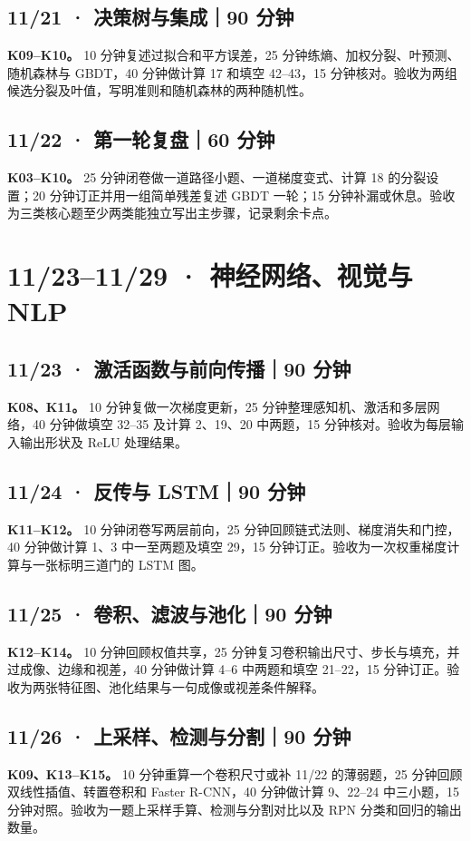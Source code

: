 \documentclass[UTF8,a4paper,11pt]{ctexart}
\begin{document}
\subsection{11/21 · 决策树与集成｜90 分钟}
\textbf{K09–K10。} 10 分钟复述过拟合和平方误差，25 分钟练熵、加权分裂、叶预测、随机森林与 GBDT，40 分钟做计算 17 和填空 42–43，15 分钟核对。验收为两组候选分裂及叶值，写明准则和随机森林的两种随机性。

\subsection{11/22 · 第一轮复盘｜60 分钟}
\textbf{K03–K10。} 25 分钟闭卷做一道路径小题、一道梯度变式、计算 18 的分裂设置；20 分钟订正并用一组简单残差复述 GBDT 一轮；15 分钟补漏或休息。验收为三类核心题至少两类能独立写出主步骤，记录剩余卡点。

\section{11/23–11/29 · 神经网络、视觉与 NLP}
\subsection{11/23 · 激活函数与前向传播｜90 分钟}
\textbf{K08、K11。} 10 分钟复做一次梯度更新，25 分钟整理感知机、激活和多层网络，40 分钟做填空 32–35 及计算 2、19、20 中两题，15 分钟核对。验收为每层输入输出形状及 ReLU 处理结果。

\subsection{11/24 · 反传与 LSTM｜90 分钟}
\textbf{K11–K12。} 10 分钟闭卷写两层前向，25 分钟回顾链式法则、梯度消失和门控，40 分钟做计算 1、3 中一至两题及填空 29，15 分钟订正。验收为一次权重梯度计算与一张标明三道门的 LSTM 图。

\subsection{11/25 · 卷积、滤波与池化｜90 分钟}
\textbf{K12–K14。} 10 分钟回顾权值共享，25 分钟复习卷积输出尺寸、步长与填充，并过成像、边缘和视差，40 分钟做计算 4–6 中两题和填空 21–22，15 分钟订正。验收为两张特征图、池化结果与一句成像或视差条件解释。

\subsection{11/26 · 上采样、检测与分割｜90 分钟}
\textbf{K09、K13–K15。} 10 分钟重算一个卷积尺寸或补 11/22 的薄弱题，25 分钟回顾双线性插值、转置卷积和 Faster R-CNN，40 分钟做计算 9、22–24 中三小题，15 分钟对照。验收为一题上采样手算、检测与分割对比以及 RPN 分类和回归的输出数量。
\end{document}
